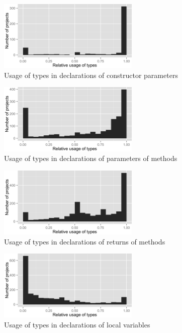 \begin{figure}[h]
\centering 
\includegraphics[width=0.6\textwidth]{../aosd_2014/analysis/result/background/dynamic-only/histograms/9_Constructor_Parameter.png} 
\caption{Usage of types in declarations of constructor parameters}
\end{figure}

\begin{figure}[h]
\centering 
\includegraphics[width=0.6\textwidth]{../aosd_2014/analysis/result/background/dynamic-only/histograms/8_Method_Parameter.png} 
\caption{Usage of types in declarations of parameters of methods}
\end{figure}

\begin{figure}[h]
\centering 
\includegraphics[width=0.6\textwidth]{../aosd_2014/analysis/result/background/dynamic-only/histograms/7_Method_Return.png} 
\caption{Usage of types in declarations of returns of methods}
\end{figure}

\begin{figure}[h]
\centering 
\includegraphics[width=0.6\textwidth]{../aosd_2014/analysis/result/background/dynamic-only/histograms/6_Local_Variable.png} 
\caption{Usage of types in declarations of local variables}
\end{figure}

